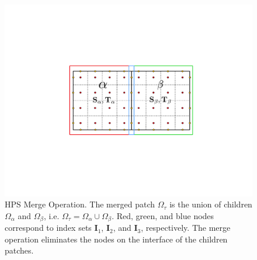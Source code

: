 \begin{figure}
    \centering
    \includegraphics[width=\columnwidth]{figures/merge_figure.pdf}
    \caption{HPS Merge Operation. The merged patch $\Omega_{\tau}$ is the union of children $\Omega_{\alpha}$ and $\Omega_{\beta}$, i.e. $\Omega_{\tau} = \Omega_{\alpha} \cup \Omega_{\beta}$. Red, green, and blue nodes correspond to index sets $\textbf{I}_1$, $\textbf{I}_2$, and $\textbf{I}_3$, respectively. The merge operation eliminates the nodes on the interface of the children patches.}
    \label{fig:merge}
\end{figure}

